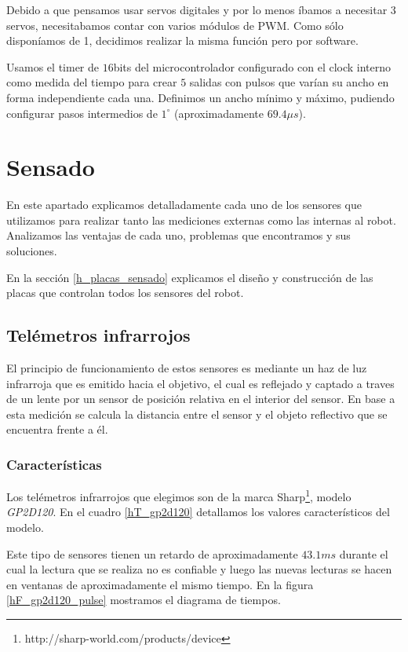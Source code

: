 Debido a que pensamos usar servos digitales y por lo menos \'ibamos a necesitar $3$ servos, necesitabamos contar con varios m\'odulos de PWM.
Como s\'olo dispon\'iamos de 1, decidimos realizar la misma funci\'on pero por software.

Usamos el timer de $16$bits del microcontrolador configurado con el clock interno como medida del tiempo para crear $5$ salidas con
pulsos que var\'ian su ancho en forma independiente cada una.
Definimos un ancho m\'inimo y m\'aximo, pudiendo configurar pasos intermedios de $1^{\circ}$ (aproximadamente $69.4\mu s$).

\section{Sensado}
\label{h_sensado}

En este apartado explicamos detalladamente cada uno de los sensores que utilizamos para realizar tanto las mediciones externas como las internas al robot.
Analizamos las ventajas de cada uno, problemas que encontramos y sus soluciones.

En la secci\'on \ref{h_placas_sensado} explicamos el dise\~no y construcci\'on de las placas que controlan todos los sensores del robot.

\subsection{Tel\'emetros infrarrojos}
\label{h_sensado_telemetros}

El principio de funcionamiento de estos sensores es mediante un haz de luz infrarroja que es emitido hacia el objetivo, el cual
es reflejado y captado a traves de un lente por un sensor de posici\'on relativa en el interior del sensor.
En base a esta medici\'on se calcula la distancia entre el sensor y el objeto reflectivo que se encuentra frente a \'el.

\subsubsection{Caracter\'isticas}
\label{h_sensado_telemetros_caracteristicas}

Los tel\'emetros infrarrojos que elegimos son de la marca Sharp\footnote{http://sharp-world.com/products/device}, modelo \emph{GP2D120}.
En el cuadro \ref{hT_gp2d120} detallamos los valores caracter\'isticos del modelo.

Este tipo de sensores tienen un retardo de aproximadamente $43.1ms$ durante el cual la lectura que se realiza no es confiable y luego
las nuevas lecturas se hacen en ventanas de aproximadamente el mismo tiempo.
En la figura \ref{hF_gp2d120_pulse} mostramos el diagrama de tiempos.

